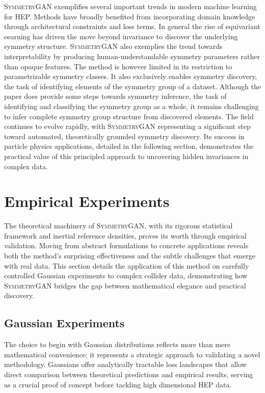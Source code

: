         \textsc{SymmetryGAN} exemplifies several important trends in modern machine learning for HEP.
        Methods have broadly benefited from incorporating domain knowledge through architectural constraints and loss terms.
        In general the rise of equivariant eearning has driven the move beyond invariance to discover the underlying symmetry structure.
        \textsc{SymmetryGAN} also exemplies the trend towards interpretability by producing human-understandable symmetry parameters rather than opaque features.
        The method is however limited in its restriction to parametrizable symmetry classes.
        It also exclusively enables symmetry discovery, the task of identifying elements of the symmetry group of a dataset.
        Although the paper does provide some steps towards symmetry inference, the task of identifying and classifying the symmetry group as a whole, it remains challenging to infer complete symmetry group structure from discovered elements.
        The field continues to evolve rapidly, with \textsc{SymmetryGAN} representing a significant step toward automated, theoretically grounded symmetry discovery.
        Its success in particle physics applications, detailed in the following section, demonstrates the practical value of this principled approach to uncovering hidden invariances in complex data.

\section{Empirical Experiments}
\label{sec:empirical-experiments}
        The theoretical machinery of \textsc{SymmetryGAN}, with its rigorous statistical framework and inertial reference densities, proves its worth through empirical validation.
        Moving from abstract formulations to concrete applications reveals both the method's surprising effectiveness and the subtle challenges that emerge with real data.
        This section details the application of this method on carefully controlled Gaussian experiments to complex collider data, demonstrating how \textsc{SymmetryGAN} bridges the gap between mathematical elegance and practical discovery.

        \subsection{Gaussian Experiments}
            The choice to begin with Gaussian distributions reflects more than mere mathematical convenience; it represents a strategic approach to validating a novel methodology.
            Gaussians offer analytically tractable loss landscapes that allow direct comparison between theoretical predictions and empirical results, serving as a crucial proof of concept before tackling high dimensional HEP data.

